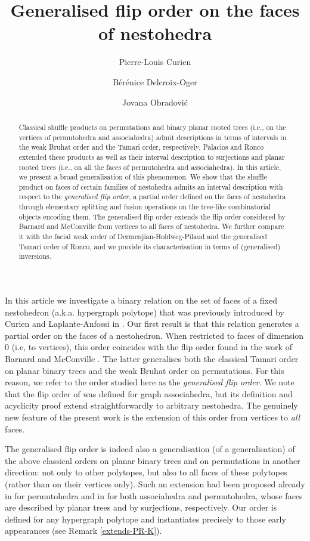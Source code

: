 \documentclass{article}
\title{Generalised flip order on the faces of nestohedra}
\author[$^\dagger$]{ Pierre-Louis Curien}
\affil[$^\dagger$]{{\footnotesize Université Paris Cité, CNRS, Inria, IRIF, Picube project-team, Paris, France}}
\author[$^\ast$]{Bérénice Delcroix-Oger}
\affil[$^\ast$]{\footnotesize Université de Montpellier, CNRS, IMAG, Montpellier, France}
\author[$^\ddagger$]{Jovana Obradovi\' c }
\affil[$^\ddagger$]{\footnotesize Mathematical Institute of the Serbian Academy of Sciences and Arts, Belgrade, Serbia}
\theoremstyle{plain}
\theoremstyle{definition}
\begin{document}
 	\maketitle


\begin{abstract}
\noindent Classical shuffle products on permutations and binary planar rooted trees (i.e., on the vertices of permutohedra and associahedra) admit descriptions in terms of intervals in the weak Bruhat order and the Tamari order, respectively. Palacios and Ronco extended these products as well as their interval description to surjections and planar rooted trees (i.e., on all the faces of permutohedra and associahedra). In this article, we present a broad generalisation of this phenomenon. We show that the shuffle product on faces of certain families of nestohedra admits an interval description with respect to the {\em generalised flip order}, a partial order defined on the faces of nestohedra through elementary splitting and fusion operations on the tree-like combinatorial objects encoding them. The generalised flip order extends the flip order considered by Barnard and McConville from vertices to all faces of nestohedra. We further compare it with the facial weak order of Dermenjian-Hohlweg-Pilaud and the generalised Tamari order of Ronco, and we provide its characterisation in terms of (generalised) inversions. 
\end{abstract}



\noindent In this article we investigate a binary relation on the set of faces of a fixed nestohedron (a.k.a. hypergraph polytope) that was previously introduced by Curien and Laplante-Anfossi in \cite{CLA2}. Our first result is that this relation generates a partial order on the faces of a nestohedron. When restricted to faces of dimension 0 (i.e, to vertices), this order coincides with the flip order found in the work of  Barnard and McConville \cite{BM}. The latter generalises both the classical Tamari order on planar binary trees and the weak Bruhat order on permutations.
For this reason, we refer to the order studied here as the {\em generalised flip order}.
We note that the flip order of \cite{BM} was defined for graph associahedra, but its definition and acyclicity proof extend straightforwardly to arbitrary nestohedra. The genuinely new feature of the present work is the extension of this order from vertices to {\em all} faces. 

The generalised flip order is indeed also a generalisation (of a generalisation) of the above classical orders on planar binary trees and on permutations in another direction: not only to other polytopes, but also to all faces of these polytopes (rather than on their vertices only). Such an extension had been proposed already in \cite{KLNPS} for permutohedra and in \cite{PalaciosRonco} for both associahedra and permutohedra, whose faces are described by planar trees and by surjections, respectively. Our order is defined for any hypergraph polytope and instantiates precisely to those early appearances (see Remark \ref{extends-PR-K}).
\end{document}
